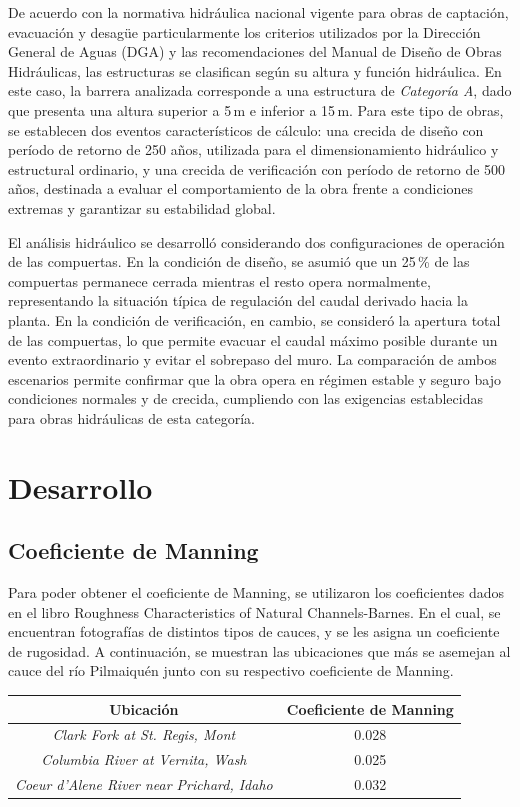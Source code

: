 \documentclass{article} %
\begin{document}
De acuerdo con la normativa hidráulica nacional vigente para obras de captación, evacuación y desagüe particularmente los criterios utilizados por la Dirección General de Aguas (DGA) y las recomendaciones del Manual de Diseño de Obras Hidráulicas, las estructuras se clasifican según su altura y función hidráulica. En este caso, la barrera analizada corresponde a una estructura de \textit{Categoría A}, dado que presenta una altura superior a 5\,m e inferior a 15\,m. Para este tipo de obras, se establecen dos eventos característicos de cálculo: una crecida de diseño con período de retorno de 250 años, utilizada para el dimensionamiento hidráulico y estructural ordinario, y una crecida de verificación con período de retorno de 500 años, destinada a evaluar el comportamiento de la obra frente a condiciones extremas y garantizar su estabilidad global.

El análisis hidráulico se desarrolló considerando dos configuraciones de operación de las compuertas. En la condición de diseño, se asumió que un 25\,\% de las compuertas permanece cerrada mientras el resto opera normalmente, representando la situación típica de regulación del caudal derivado hacia la planta. En la condición de verificación, en cambio, se consideró la apertura total de las compuertas, lo que permite evacuar el caudal máximo posible durante un evento extraordinario y evitar el sobrepaso del muro. La comparación de ambos escenarios permite confirmar que la obra opera en régimen estable y seguro bajo condiciones normales y de crecida, cumpliendo con las exigencias establecidas para obras hidráulicas de esta categoría.


\newpage
\section{Desarrollo}
\subsection{Coeficiente de Manning}
Para poder obtener el coeficiente de Manning, se utilizaron los coeficientes dados en el libro Roughness Characteristics of Natural Channels-Barnes. En el cual, se encuentran fotografías de distintos tipos de cauces, y se les asigna un coeficiente de rugosidad. A continuación, se muestran las ubicaciones que más se asemejan al cauce del río Pilmaiquén junto con su respectivo coeficiente de Manning.
\begin{table}[h!]
    \centering
    \begin{tabular}{c c}
        \textbf{Ubicación} & \textbf{Coeficiente de Manning} \\
        \hline
        \textit{Clark Fork at St. Regis, Mont} & 0.028 \\ 
        \textit{Columbia River at Vernita, Wash} & 0.025 \\
        \textit{Coeur d'Alene River near Prichard, Idaho} & 0.032 \\\hline
    \end{tabular}
\end{table}
\end{document}
